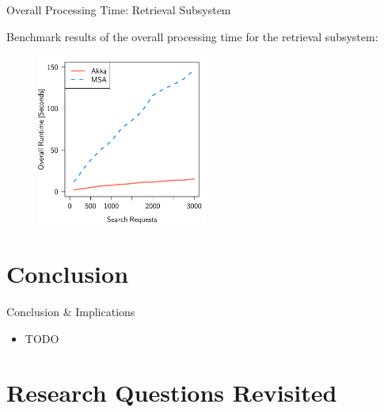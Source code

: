 \documentclass{beamer}
\begin{document}

\begin{frame}{Overall Processing Time: Retrieval Subsystem}

Benchmark results of the overall processing time for the retrieval subsystem:

\begin{center}
  \begin{figure} 
    \includegraphics[width=0.5\textwidth]{graphics/eval-search-rtt-overall.pdf} 
  \end{figure}
\end{center}

\end{frame}


\section{Conclusion}


\begin{frame}{Conclusion \& Implications}

\begin{itemize}
  \item TODO
\end{itemize}

\end{frame}


\section{Research Questions Revisited}
\end{document}
